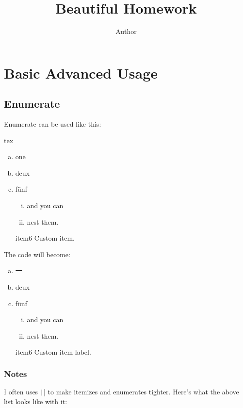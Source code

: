 \documentclass{fhw}
\title{Beautiful Homework}
\author{Author}
\begin{document}
\maketitle

\section{Basic Advanced Usage}

\subsection{Enumerate}

Enumerate can be used like this:
\begin{Code}{tex}
\begin{enumerate}[(a)]
  \item one
  \item deux
    \setcounter{enumi}{4}
  \item fünf
    \begin{enumerate}[i.]
      \item and you can
      \item nest them.
    \end{enumerate}
  \item[item6] Custom item.
\end{enumerate}
\end{Code}

The code will become: 

\begin{enumerate}[(a)]
	\item 一
	\item deux
	\setcounter{enumi}{4}
	\item fünf
		\begin{enumerate}[i.]
			\item and you can
			\item nest them.
		\end{enumerate}
	\item[item6] Custom item label.
\end{enumerate}

\subsubsection{Notes}

I often uses \texttt|\setlength{\itemsep}{0pt}\setlength{\parskip}{0pt}| to make itemizes and enumerates tighter.
Here's what the above list looks like with it:
\end{document}

